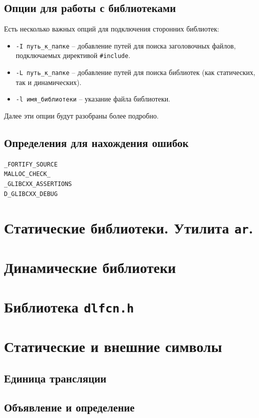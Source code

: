 \documentclass{article}
\begin{document}
\subsection*{Опции для работы с библиотеками}
Есть несколько важных опций для подключения сторонних библиотек:
\begin{itemize}
\item \texttt{-I путь\_к\_папке} -- добавление путей для поиска заголовочных файлов, подключаемых директивой \texttt{\#include}.
\item \texttt{-L путь\_к\_папке} -- добавление путей для поиска библиотек (как статических, так и динамических).
\item \texttt{-l имя\_библиотеки} -- указание файла библиотеки.
\end{itemize}
Далее эти опции будут разобраны более подробно.


\subsection*{Определения для нахождения ошибок}
\texttt{\_FORTIFY\_SOURCE}\\
\texttt{MALLOC\_CHECK\_}\\
\texttt{\_GLIBCXX\_ASSERTIONS}\\
\texttt{D\_GLIBCXX\_DEBUG} 

\newpage
\section{Статические библиотеки. Утилита \texttt{ar}.}

\section{Динамические библиотеки}


\section{Библиотека \texttt{dlfcn.h}}


\section{Статические и внешние символы}
\subsection*{Единица трансляции}
\subsection*{Объявление и определение}
\end{document}
